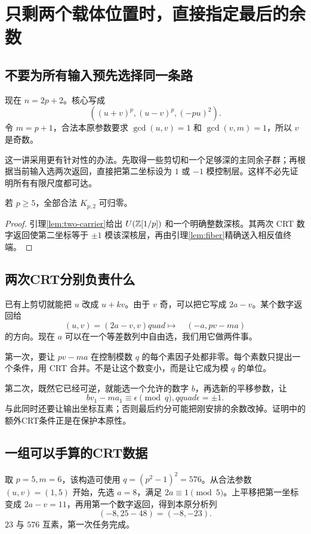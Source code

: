 \chapter{只剩两个载体位置时，直接指定最后的余数}\label{ch:two}
\section{不要为所有输入预先选择同一条路}
现在 $n=2p+2$。核心写成
\[((u+v)^p,(u-v)^p,(-pu)^2).
\]
令 $m=p+1$，合法本原参数要求 $\gcd(u,v)=1$ 和 $\gcd(v,m)=1$，所以 $v$ 是奇数。

这一讲采用更有针对性的办法。先取得一些剪切和一个足够深的主同余子群；再根据当前输入选两次返回，直接把第二坐标设为 $1$ 或 $-1$ 模控制层。这样不必先证明所有有限尺度都可达。
\begin{proposition}\label{prop:r2}
若 $p\ge5$，全部合法 $K_{p,2}$ 可归零。
\end{proposition}
\begin{proof}
引理\ref{lem:two-carrier}给出 $U(\mathbb Z[1/p])$ 和一个明确整数深核。其两次 CRT 数字返回使第二坐标等于 $\pm1$ 模该深核层，再由引理\ref{lem:fiber}精确送入相反值终端。
\end{proof}

\section{两次CRT分别负责什么}
已有上剪切就能把 $u$ 改成 $u+kv$。由于 $v$ 奇，可以把它写成 $2a-v$。某个数字返回给
\[(u,v)=(2a-v,v)quad\longmapsto\quad(-a,pv-ma)
\]
的方向。现在 $a$ 可以在一个等差数列中自由选，我们用它做两件事。

第一次，要让 $pv-ma$ 在控制模数 $q$ 的每个素因子处都非零。每个素数只提出一个条件，用 CRT 合并。不是让这个数变小，而是让它成为模 $q$ 的单位。

第二次，既然它已经可逆，就能选一个允许的数字 $b$，再选新的平移参数，让
\[bv_1-ma_1\equiv\epsilon\pmod q,qquad\epsilon=\pm1.
\]
与此同时还要让输出坐标互素；否则最后约分可能把刚安排的余数改掉。证明中的额外CRT条件正是在保护本原性。

\section{一组可以手算的CRT数据}
取 $p=5,m=6$，该构造可使用 $q=(p^2-1)^2=576$。从合法参数 $(u,v)=(1,5)$ 开始，先选 $a=8$，满足 $2a\equiv1\pmod5$。上平移把第一坐标变成 $2a-v=11$，再用第一个数字返回，得到本原分析列
\[(-8,25-48)=(-8,-23).
\]
$23$ 与 $576$ 互素，第一次任务完成。

